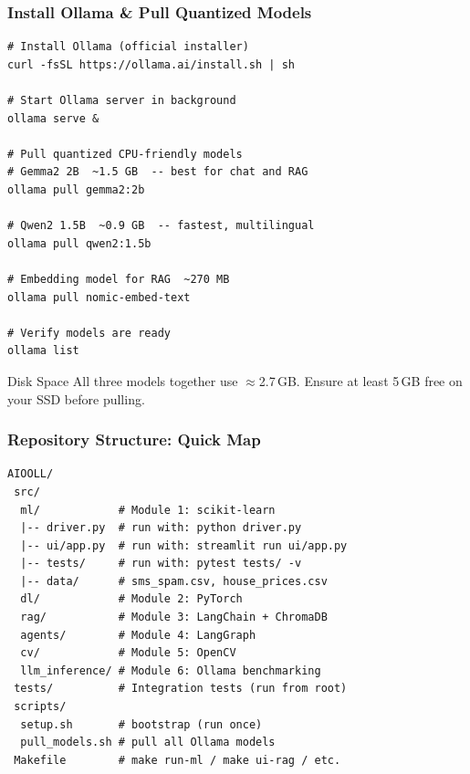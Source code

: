 \begin{frame}[fragile]\frametitle{Install Ollama \& Pull Quantized Models}
\begin{lstlisting}
# Install Ollama (official installer)
curl -fsSL https://ollama.ai/install.sh | sh

# Start Ollama server in background
ollama serve &

# Pull quantized CPU-friendly models
# Gemma2 2B  ~1.5 GB  -- best for chat and RAG
ollama pull gemma2:2b

# Qwen2 1.5B  ~0.9 GB  -- fastest, multilingual
ollama pull qwen2:1.5b

# Embedding model for RAG  ~270 MB
ollama pull nomic-embed-text

# Verify models are ready
ollama list
\end{lstlisting}
\begin{alertblock}{Disk Space}
All three models together use $\approx$2.7\,GB. Ensure at least 5\,GB free on your SSD before pulling.
\end{alertblock}
\end{frame}

\begin{frame}[fragile]\frametitle{Repository Structure: Quick Map}
\begin{lstlisting}[language={}]
AIOOLL/
 src/
  ml/            # Module 1: scikit-learn
  |-- driver.py  # run with: python driver.py
  |-- ui/app.py  # run with: streamlit run ui/app.py
  |-- tests/     # run with: pytest tests/ -v
  |-- data/      # sms_spam.csv, house_prices.csv
  dl/            # Module 2: PyTorch
  rag/           # Module 3: LangChain + ChromaDB
  agents/        # Module 4: LangGraph
  cv/            # Module 5: OpenCV
  llm_inference/ # Module 6: Ollama benchmarking
 tests/          # Integration tests (run from root)
 scripts/
  setup.sh       # bootstrap (run once)
  pull_models.sh # pull all Ollama models
 Makefile        # make run-ml / make ui-rag / etc.
\end{lstlisting}
\end{frame}

